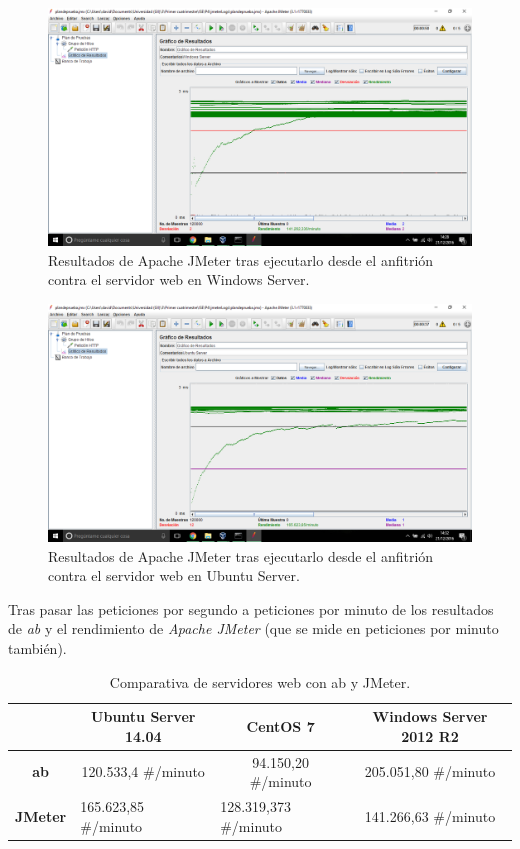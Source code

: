 \begin{figure}[H]
	\centering
	\includegraphics[scale=0.3]{jmeterWindows.png}
	\caption{Resultados de Apache JMeter tras ejecutarlo desde el anfitrión contra el servidor web en Windows Server.}
\end{figure}

\begin{figure}[H]
	\centering
	\includegraphics[scale=0.3]{jmeterUbuntu.png}
	\caption{Resultados de Apache JMeter tras ejecutarlo desde el anfitrión contra el servidor web en Ubuntu Server.}
\end{figure}

Tras pasar las peticiones por segundo a peticiones por minuto de los resultados de \textit{ab} y el rendimiento de \textit{Apache JMeter} (que se mide en peticiones por minuto también).

\begin{table}[H]
	\centering
	\label{my-label}
	\begin{tabular}{c|c|c|c|}
		\cline{2-4}
		\multicolumn{1}{l|}{}                 & \textbf{Ubuntu Server 14.04}              & \textbf{CentOS 7}                          & \textbf{Windows Server 2012 R2} \\ \hline
		\multicolumn{1}{|c|}{\textbf{ab}}     & 120.533,4 \#/minuto                       & 94.150,20 \#/minuto                        & 205.051,80 \#/minuto            \\ \hline
		\multicolumn{1}{|c|}{\textbf{JMeter}} & \multicolumn{1}{l|}{165.623,85 \#/minuto} & \multicolumn{1}{l|}{128.319,373 \#/minuto} & 141.266,63 \#/minuto            \\ \hline
	\end{tabular}
	\caption{Comparativa de servidores web con ab y JMeter.}
\end{table}

